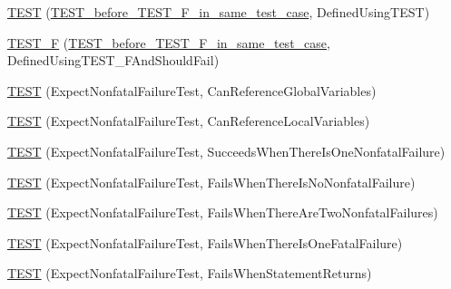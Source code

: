 \begin{DoxyCompactItemize}
\item 
\mbox{\hyperlink{_obj__test_2lib_2googletest-release-1_88_81_2googletest_2test_2googletest-output-test___8cc_a80bcd554d66913b961ad814266a403a8}{T\+E\+ST}} (\mbox{\hyperlink{class_t_e_s_t__before___t_e_s_t___f__in__same__test__case}{T\+E\+S\+T\+\_\+before\+\_\+\+T\+E\+S\+T\+\_\+\+F\+\_\+in\+\_\+same\+\_\+test\+\_\+case}}, Defined\+Using\+T\+E\+ST)
\item 
\mbox{\hyperlink{_obj__test_2lib_2googletest-release-1_88_81_2googletest_2test_2googletest-output-test___8cc_aa0ba9be79b1b05ddadfc8d25c099df31}{T\+E\+S\+T\+\_\+F}} (\mbox{\hyperlink{class_t_e_s_t__before___t_e_s_t___f__in__same__test__case}{T\+E\+S\+T\+\_\+before\+\_\+\+T\+E\+S\+T\+\_\+\+F\+\_\+in\+\_\+same\+\_\+test\+\_\+case}}, Defined\+Using\+T\+E\+S\+T\+\_\+\+F\+And\+Should\+Fail)
\item 
\mbox{\hyperlink{_obj__test_2lib_2googletest-release-1_88_81_2googletest_2test_2googletest-output-test___8cc_a3dd01f9996bd85dd50bd7632f58cbf8c}{T\+E\+ST}} (Expect\+Nonfatal\+Failure\+Test, Can\+Reference\+Global\+Variables)
\item 
\mbox{\hyperlink{_obj__test_2lib_2googletest-release-1_88_81_2googletest_2test_2googletest-output-test___8cc_afe7af77e310ee1a7599e2bc1f0f14354}{T\+E\+ST}} (Expect\+Nonfatal\+Failure\+Test, Can\+Reference\+Local\+Variables)
\item 
\mbox{\hyperlink{_obj__test_2lib_2googletest-release-1_88_81_2googletest_2test_2googletest-output-test___8cc_ac144593aa4a95ae47c0bb03def354f66}{T\+E\+ST}} (Expect\+Nonfatal\+Failure\+Test, Succeeds\+When\+There\+Is\+One\+Nonfatal\+Failure)
\item 
\mbox{\hyperlink{_obj__test_2lib_2googletest-release-1_88_81_2googletest_2test_2googletest-output-test___8cc_a3984cefae98995e99cc3de7251998c34}{T\+E\+ST}} (Expect\+Nonfatal\+Failure\+Test, Fails\+When\+There\+Is\+No\+Nonfatal\+Failure)
\item 
\mbox{\hyperlink{_obj__test_2lib_2googletest-release-1_88_81_2googletest_2test_2googletest-output-test___8cc_a17f835822727dac7b75b74ed70d2fbd2}{T\+E\+ST}} (Expect\+Nonfatal\+Failure\+Test, Fails\+When\+There\+Are\+Two\+Nonfatal\+Failures)
\item 
\mbox{\hyperlink{_obj__test_2lib_2googletest-release-1_88_81_2googletest_2test_2googletest-output-test___8cc_ab9c67cf52ef031fdf619d61283da1ca7}{T\+E\+ST}} (Expect\+Nonfatal\+Failure\+Test, Fails\+When\+There\+Is\+One\+Fatal\+Failure)
\item 
\mbox{\hyperlink{_obj__test_2lib_2googletest-release-1_88_81_2googletest_2test_2googletest-output-test___8cc_aa5976cbca1620f7fea18689a3cbf5333}{T\+E\+ST}} (Expect\+Nonfatal\+Failure\+Test, Fails\+When\+Statement\+Returns)

\end{DoxyCompactItemize}
